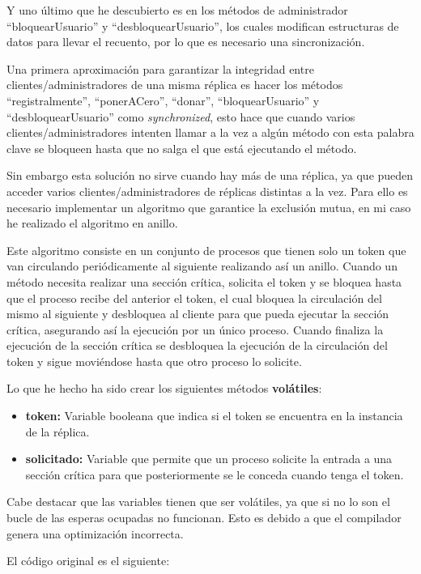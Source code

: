 \documentclass{article}
\begin{document}
Y uno último que he descubierto es en los métodos de administrador ``bloquearUsuario'' y ``desbloquearUsuario'', los cuales modifican estructuras de datos para llevar el recuento, por lo que es necesario una sincronización.

Una primera aproximación para garantizar la integridad entre clientes/administradores de una misma réplica es hacer los métodos ``registralmente'', ``ponerACero'', ``donar'', ``bloquearUsuario'' y ``desbloquearUsuario'' como \textit{synchronized}, esto hace que cuando varios clientes/administradores intenten llamar a la vez a algún método con esta palabra clave se bloqueen hasta que no salga el que está ejecutando el método.

Sin embargo esta solución no sirve cuando hay más de una réplica, ya que pueden acceder varios clientes/administradores de réplicas distintas a la vez. Para ello es necesario implementar un algoritmo que garantice la exclusión mutua, en mi caso he realizado el algoritmo en anillo.

Este algoritmo consiste en un conjunto de procesos que tienen solo un token que van circulando periódicamente al siguiente realizando así un anillo. Cuando un método necesita realizar una sección crítica, solicita el token y se bloquea hasta que el proceso recibe del anterior el token, el cual bloquea la circulación del mismo al siguiente y desbloquea al cliente para que pueda ejecutar la sección crítica, asegurando así la ejecución por un único proceso. Cuando finaliza la ejecución de la sección crítica se desbloquea la ejecución de la circulación del token y sigue moviéndose hasta que otro proceso lo solicite.

Lo que he hecho ha sido crear los siguientes métodos \textbf{volátiles}:

\begin{itemize}
    \item \textbf{token: }Variable booleana que indica si el token se encuentra en la instancia de la réplica.
    \item \textbf{solicitado: }Variable que permite que un proceso solicite la entrada a una sección crítica para que posteriormente se le conceda cuando tenga el token.
\end{itemize}

Cabe destacar que las variables tienen que ser volátiles, ya que si no lo son el bucle de las esperas ocupadas no funcionan. Esto es debido a que el compilador genera una optimización incorrecta.

El código original es el siguiente:
\end{document}
